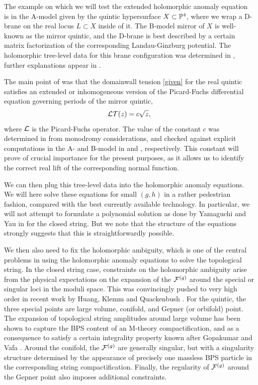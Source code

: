 The example on which we will test the extended holomorphic anomaly
equation is in the A-model given by the quintic hypersurface $X\subset
{\mathbb P}^4$, where we wrap a D-brane on the real locus $L\subset X$ 
inside of it. The B-model mirror of $X$ is well-known as the mirror 
quintic, and the D-brane is best described by a certain matrix 
factorization of the corresponding Landau-Ginzburg potential. The 
holomorphic tree-level data for this brane configuration was determined 
in \cite{open}, further explanations appear in \cite{mowa}.

The main point of \cite{open} was that the domainwall tension \eqref{given} 
for the real quintic satisfies an extended or inhomogeneous version of
the Picard-Fuchs differential equation governing periods of the 
mirror quintic,
\begin{equation}
{\cal L} {\cal T}(z) = c \sqrt{z},
\end{equation}
where ${\cal L}$ is the Picard-Fuchs operator. The value of the
constant $c$ was determined in \cite{open} from monodromy 
considerations, and checked against explicit computations in 
the A- and B-model in \cite{psw} and \cite{mowa}, respectively.
This constant will prove of crucial importance 
for the present purposes, as it allows us to identify the correct 
real lift of the corresponding normal function.

We can then plug this tree-level data into the holomorphic
anomaly equations. We will here solve these equations for small
$(g,h)$ in a rather pedestrian fashion, compared with the best currently 
available technology. In particular, we will not attempt to formulate
a polynomial solution as done by Yamaguchi and Yau in \cite{yayau}
for the closed string. But we note that the structure of the equations 
strongly suggests that this is straightforwardly possible.

We then also need to fix the holomorphic ambiguity, which is one of
the central problems in using the holomorphic anomaly equations to
solve the topological string. In the closed string case, constraints
on the holomorphic ambiguity arise from the physical expectations
on the expansion of the ${{\cal F}}^{(g)}$ around the special or singular loci 
in the moduli space. This was convincingly pushed to very high 
order in recent work by Huang, Klemm and Quackenbush \cite{hkq}. For 
the quintic, the three special points are large volume, conifold, 
and Gepner (or orbifold) point. The expansion of topological string 
amplitudes around large volume has been shown to capture the BPS content 
of an M-theory compactification, and as a consequence to satisfy a 
certain integrality property known after Gopakumar and Vafa \cite{gova}. 
Around the conifold, the ${{\cal F}}^{(g)}$ are generally singular, but with a 
singularity structure determined by the appearance of precisely one 
massless BPS particle in the corresponding string compactification. 
Finally, the regularity of ${{\cal F}}^{(g)}$ around the Gepner point also 
imposes additional constraints.
 
